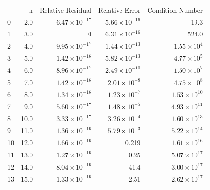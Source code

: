 \begin{tabular}{lrrrr}
 & n & Relative Residual & Relative Error & Condition Number \\
0 & 2.0 & $6.47 \times 10^{-17}$ & $5.66 \times 10^{-16}$ & 19.3 \\
1 & 3.0 & $0$ & $6.31 \times 10^{-16}$ & 524.0 \\
2 & 4.0 & $9.95 \times 10^{-17}$ & $1.44 \times 10^{-13}$ & $1.55 \times 10^{4}$ \\
3 & 5.0 & $1.42 \times 10^{-16}$ & $5.82 \times 10^{-13}$ & $4.77 \times 10^{5}$ \\
4 & 6.0 & $8.96 \times 10^{-17}$ & $2.49 \times 10^{-10}$ & $1.50 \times 10^{7}$ \\
5 & 7.0 & $1.42 \times 10^{-16}$ & $2.01 \times 10^{-8}$ & $4.75 \times 10^{8}$ \\
6 & 8.0 & $1.34 \times 10^{-16}$ & $1.23 \times 10^{-7}$ & $1.53 \times 10^{10}$ \\
7 & 9.0 & $5.60 \times 10^{-17}$ & $1.48 \times 10^{-5}$ & $4.93 \times 10^{11}$ \\
8 & 10.0 & $3.33 \times 10^{-17}$ & $3.26 \times 10^{-4}$ & $1.60 \times 10^{13}$ \\
9 & 11.0 & $1.36 \times 10^{-16}$ & $5.79 \times 10^{-3}$ & $5.22 \times 10^{14}$ \\
10 & 12.0 & $1.66 \times 10^{-16}$ & 0.219 & $1.61 \times 10^{16}$ \\
11 & 13.0 & $1.27 \times 10^{-16}$ & 0.25 & $5.07 \times 10^{17}$ \\
12 & 14.0 & $8.04 \times 10^{-16}$ & 41.4 & $3.00 \times 10^{17}$ \\
13 & 15.0 & $1.33 \times 10^{-16}$ & 2.51 & $2.62 \times 10^{17}$ \\
\end{tabular}
